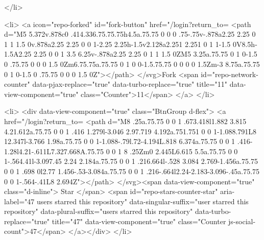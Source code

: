   </li>

  <li>
          <a icon="repo-forked" id="fork-button" href="/login?return_to=%
    <path d="M5 5.372v.878c0 .414.336.75.75.75h4.5a.75.75 0 0 0 .75-.75v-.878a2.25 2.25 0 1 1 1.5 0v.878a2.25 2.25 0 0 1-2.25 2.25h-1.5v2.128a2.251 2.251 0 1 1-1.5 0V8.5h-1.5A2.25 2.25 0 0 1 3.5 6.25v-.878a2.25 2.25 0 1 1 1.5 0ZM5 3.25a.75.75 0 1 0-1.5 0 .75.75 0 0 0 1.5 0Zm6.75.75a.75.75 0 1 0 0-1.5.75.75 0 0 0 0 1.5Zm-3 8.75a.75.75 0 1 0-1.5 0 .75.75 0 0 0 1.5 0Z"></path>
</svg>Fork
    <span id="repo-network-counter" data-pjax-replace="true" data-turbo-replace="true" title="11" data-view-component="true" class="Counter">11</span>
</a>
  </li>

  <li>
        <div data-view-component="true" class="BtnGroup d-flex">
        <a href="/login?return_to=%
    <path d="M8 .25a.75.75 0 0 1 .673.418l1.882 3.815 4.21.612a.75.75 0 0 1 .416 1.279l-3.046 2.97.719 4.192a.751.751 0 0 1-1.088.791L8 12.347l-3.766 1.98a.75.75 0 0 1-1.088-.79l.72-4.194L.818 6.374a.75.75 0 0 1 .416-1.28l4.21-.611L7.327.668A.75.75 0 0 1 8 .25Zm0 2.445L6.615 5.5a.75.75 0 0 1-.564.41l-3.097.45 2.24 2.184a.75.75 0 0 1 .216.664l-.528 3.084 2.769-1.456a.75.75 0 0 1 .698 0l2.77 1.456-.53-3.084a.75.75 0 0 1 .216-.664l2.24-2.183-3.096-.45a.75.75 0 0 1-.564-.41L8 2.694Z"></path>
</svg><span data-view-component="true" class="d-inline">
          Star
</span>          <span id="repo-stars-counter-star" aria-label="47 users starred this repository" data-singular-suffix="user starred this repository" data-plural-suffix="users starred this repository" data-turbo-replace="true" title="47" data-view-component="true" class="Counter js-social-count">47</span>
</a></div>
  </li>

